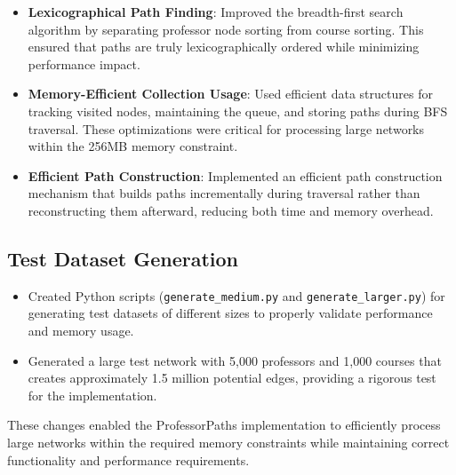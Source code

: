 \documentclass[11pt]{article}
\begin{document}
\begin{itemize}
    \item \textbf{Lexicographical Path Finding}: Improved the breadth-first search algorithm by separating professor node sorting from course sorting. This ensured that paths are truly lexicographically ordered while minimizing performance impact.
    
    \item \textbf{Memory-Efficient Collection Usage}: Used efficient data structures for tracking visited nodes, maintaining the queue, and storing paths during BFS traversal. These optimizations were critical for processing large networks within the 256MB memory constraint.
    
    \item \textbf{Efficient Path Construction}: Implemented an efficient path construction mechanism that builds paths incrementally during traversal rather than reconstructing them afterward, reducing both time and memory overhead.
\end{itemize}

\subsection*{Test Dataset Generation}

\begin{itemize}
    \item Created Python scripts (\texttt{generate\_medium.py} and \texttt{generate\_larger.py}) for generating test datasets of different sizes to properly validate performance and memory usage.
    
    \item Generated a large test network with 5,000 professors and 1,000 courses that creates approximately 1.5 million potential edges, providing a rigorous test for the implementation.
\end{itemize}

These changes enabled the ProfessorPaths implementation to efficiently process large networks within the required memory constraints while maintaining correct functionality and performance requirements.
\end{document}
